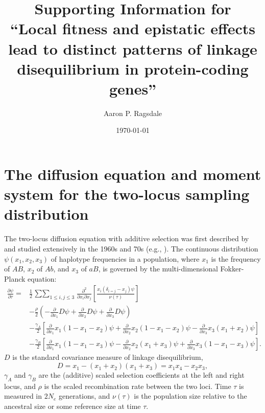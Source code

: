 \documentclass[]{article}
\begin{document}
\title{Supporting Information for\\
``Local fitness and epistatic effects lead to distinct patterns of linkage disequilibrium in protein-coding genes''}
\author[]{Aaron P. Ragsdale}
\date{\today}
\maketitle

\renewcommand{\thefigure}{S\arabic{figure}}
\renewcommand{\thetable}{S\arabic{table}}
\renewcommand{\theequation}{S\arabic{equation}}
\renewcommand{\thesection}{S\arabic{section}}
\setcounter{figure}{0}
\setcounter{table}{0}
\setcounter{equation}{0}
\setcounter{section}{0}

\tableofcontents
\newpage

\clearpage

\section{The diffusion equation and moment system for the two-locus sampling distribution}

The two-locus diffusion equation with additive selection was first described by
\citet{Kimura1955-qe} and studied extensively in the 1960s and 70s (e.g.,
\citet{Hill1966-gv,Ohta1969-ie}). The continuous distribution \(\psi(x_1, x_2,
x_3)\) of haplotype frequencies in a population, where \(x_1\) is the frequency
of \(AB\), \(x_2\) of \(Ab\), and \(x_3\) of \(aB\), is governed by the
multi-dimensional Fokker-Planck equation:
\begin{align} \label{eq:diffeq}
\frac{\partial \psi}{\partial \tau} = &
\frac{1}{2}\mathop{\sum\sum}_{1\leq i, j \leq 3}
\frac{\partial^2}{\partial x_i \partial x_j}
\left[\frac{x_i(\delta_{i=j}-x_j)\psi}{\nu(\tau)}\right] \\\nonumber
& -\frac{\rho}{2}\left(-\frac{\partial}{\partial x_1} D\psi
  + \frac{\partial}{\partial x_2} D\psi
  + \frac{\partial}{\partial x_3} D\psi\right) \\\nonumber
& - \frac{\gamma_A}{2}\left[
  \frac{\partial}{\partial x_1} x_1(1-x_1-x_2)\psi
  + \frac{\partial}{\partial x_2} x_2(1-x_1-x_2)\psi
  - \frac{\partial}{\partial x_3} x_3(x_1+x_2)\psi
  \right] \\\nonumber
& -\frac{\gamma_B}{2}\left[
  \frac{\partial}{\partial x_1} x_1(1-x_1-x_3)\psi
  - \frac{\partial}{\partial x_2} x_2(x_1+x_3)\psi
  + \frac{\partial}{\partial x_3} x_3(1-x_1-x_3)\psi
  \right].
\end{align}
\(D\) is the standard covariance measure of linkage disequilibrium, \[D=x_1 -
(x_1+x_2)(x_1+x_3) = x_1 x_4 - x_2 x_3,\] \(\gamma_A\) and \(\gamma_B\) are the
(additive) scaled selection coefficients at the left and right locus, and
\(\rho\) is the scaled recombination rate between the two loci. Time \(\tau\) is
measured in \(2N_e\) generations, and \(\nu(\tau)\) is the population size relative
to the ancestral size or some reference size at time \(\tau\).
\end{document}
